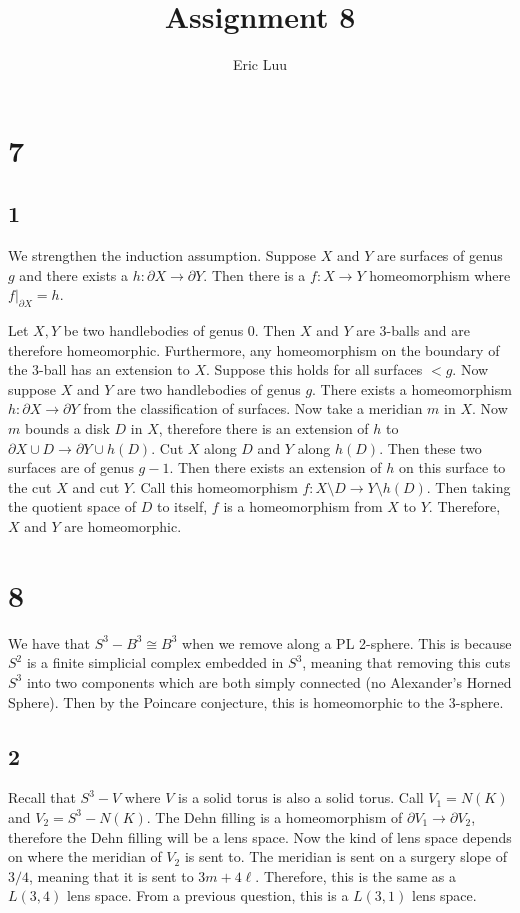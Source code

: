 \documentclass{article}
\title{Assignment 8}
\author{Eric Luu}
\theoremstyle{definition}
\numberwithin{theorem}{section}
\numberwithin{equation}{section}
\begin{document}
\section{7}

\subsection{1}
We strengthen the induction assumption. Suppose $X$ and $Y$ are surfaces of genus $g$ and there exists a $h: \partial X \rightarrow \partial Y$. Then there is a $f : X \rightarrow Y$ homeomorphism where $f|_{\partial X}= h$. 

Let $X, Y$ be two handlebodies of genus $0$. Then $X$ and $Y$ are $3$-balls and are therefore homeomorphic. Furthermore, any homeomorphism on the boundary of the $3$-ball has an extension to $X$. Suppose this holds for all surfaces $< g$. Now suppose $X$ and $Y$ are two handlebodies of genus $g$. There exists a homeomorphism $h: \partial X \rightarrow \partial Y$ from the classification of surfaces. Now take a meridian $m$ in $X$. Now $m$ bounds a disk $D$ in $X$, therefore there is an extension of $h$ to $\partial X \cup D \rightarrow \partial Y \cup h(D)$. Cut $X$ along $D$ and $Y$ along $h(D)$. Then these two surfaces are of genus $g-1$. Then there exists an extension of $h$ on this surface to the cut $X$ and cut $Y$. Call this homeomorphism $f : X \setminus D \rightarrow Y \setminus h(D)$. Then taking the quotient space of $D$ to itself, $f$ is a homeomorphism from $X$ to $Y$. Therefore, $X$ and $Y$ are homeomorphic. 


\section{8}

We have that $S^3 - B^3 \cong B^3$ when we remove along a PL 2-sphere. This is because $S^2$ is a finite simplicial complex embedded in $S^3$, meaning that removing this cuts $S^3$ into two components which are both simply connected (no Alexander's Horned Sphere). Then by the Poincare conjecture, this is homeomorphic to the 3-sphere. 

\subsection{2}
Recall that $S^3 - V$ where $V$ is a solid torus is also a solid torus. Call $V_1 = N(K)$ and $V_2 = S^3 - N(K)$. The Dehn filling is a homeomorphism of $\partial V_1 \rightarrow \partial V_2$, therefore the Dehn filling will be a lens space. Now the kind of lens space depends on where the meridian of $V_2$ is sent to. The meridian is sent on a surgery slope of $3/4$, meaning that it is sent to $3m + 4 \ell$. Therefore, this is the same as a $L(3,4)$ lens space. From a previous question, this is a $L(3, 1)$ lens space. 
\end{document}
